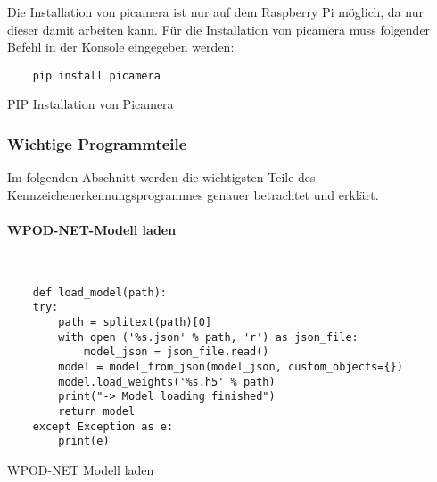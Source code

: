 Die Installation von picamera ist nur auf dem Raspberry Pi möglich, da nur dieser damit arbeiten kann. 
Für die Installation von picamera muss folgender Befehl in der Konsole eingegeben werden:

\begin{listing}[H]
    \begin{verbatim}
    pip install picamera
    \end{verbatim}
    \caption{PIP Installation von Picamera}
\end{listing}

\subsubsection{Wichtige Programmteile}

Im folgenden Abschnitt werden die wichtigsten Teile des Kennzeichenerkennungsprogrammes genauer betrachtet und erklärt.

\paragraph{WPOD-NET-Modell laden}\mbox{}\\

\begin{listing}[H]
    \begin{verbatim}
    def load_model(path):
    try:
        path = splitext(path)[0]
        with open ('%s.json' % path, 'r') as json_file:
            model_json = json_file.read()
        model = model_from_json(model_json, custom_objects={})
        model.load_weights('%s.h5' % path)
        print("-> Model loading finished")
        return model
    except Exception as e:
        print(e)
    \end{verbatim}
    \caption{WPOD-NET Modell laden}
\end{listing}

